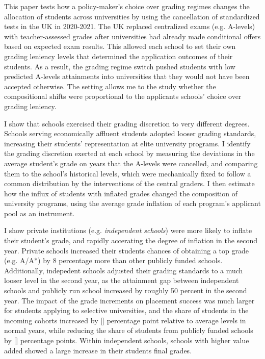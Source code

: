 This paper tests how a policy-maker's choice over grading regimes changes the allocation of students across universities by using the cancellation of standardized tests in the UK in 2020-2021. The UK replaced centralized exams (e.g. A-levels) with teacher-assessed grades after universities had already made conditional offers based on expected exam results. This allowed each school to set their own grading leniency levels that determined the application outcomes of their students. As a result, the grading regime switch pushed students with low predicted A-levels attainments into universities that they would not have been accepted otherwise. The setting allows me to the study whether the compositional shifts were proportional to the applicants schools' choice over grading leniency. 

I show that schools exercised their grading discretion to very different degrees. Schools serving economically affluent students adopted looser grading standards, increasing their students' representation at elite university programs. I identify the grading discretion exerted at each school by measuring the deviations in the average student's grade on years that the A-levels were cancelled, and comparing them to the school's historical levels, which were mechanically fixed to follow a common distribution by the interventions of the central graders. I then estimate how the influx of students with inflated grades changed the composition of university programs, using the average grade inflation of each program's applicant pool as an instrument.  

I show private institutions (e.g. \emph{independent schools}) were more likely to inflate their student's grade, and rapidly accerating the degree of inflation in the second year.  Private schools increased their students chances of obtaining a top grade (e.g. A/A*) by 8 percentage more than other publicly funded schools. Additionally, indepedent schools adjusted their grading standards to a much looser level in the second year, as the attainment gap between independent schools and publicly run school increased by roughly 50 percent in the second year. The impact of the grade increments on placement success was much larger for students applying to selective universities, and the share of students in the incoming cohorts increased by [] percentage point relative to average levels in normal years, while reducing the share of students from publicly funded schools by [] percentage points. Within independent schools, schools with higher value added showed a large increase in their students final grades.

